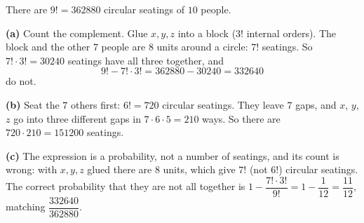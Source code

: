 There are $9!=362880$ circular seatings of $10$ people.

\textbf{(a)} Count the complement. Glue $x,y,z$ into a block ($3!$ internal orders). The block and the other $7$ people are $8$ units around a circle: $7!$ seatings. So $7!\cdot3!=30240$ seatings have all three together, and
\[
9!-7!\cdot3!=362880-30240=\boxed{332640}
\]
do not.

\textbf{(b)} Seat the $7$ others first: $6!=720$ circular seatings. They leave $7$ gaps, and $x$, $y$, $z$ go into three different gaps in $7\cdot6\cdot5=210$ ways. So there are $720\cdot210=\boxed{151200}$ seatings.

\textbf{(c)} The expression is a probability, not a number of seatings, and its count is wrong: with $x,y,z$ glued there are $8$ units, which give $7!$ (not $6!$) circular seatings. The correct probability that they are not all together is $1-\dfrac{7!\cdot3!}{9!}=1-\dfrac{1}{12}=\dfrac{11}{12}$, matching $\dfrac{332640}{362880}$.
